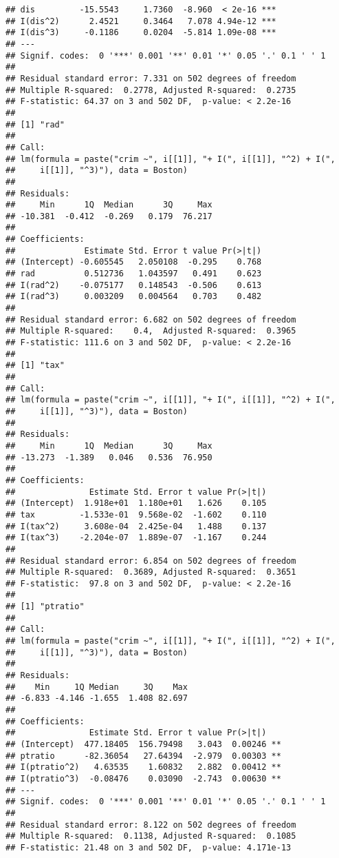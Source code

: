 \documentclass[
]{article}
\begin{document}
\begin{verbatim}
## dis         -15.5543     1.7360  -8.960  < 2e-16 ***
## I(dis^2)      2.4521     0.3464   7.078 4.94e-12 ***
## I(dis^3)     -0.1186     0.0204  -5.814 1.09e-08 ***
## ---
## Signif. codes:  0 '***' 0.001 '**' 0.01 '*' 0.05 '.' 0.1 ' ' 1
## 
## Residual standard error: 7.331 on 502 degrees of freedom
## Multiple R-squared:  0.2778, Adjusted R-squared:  0.2735 
## F-statistic: 64.37 on 3 and 502 DF,  p-value: < 2.2e-16
## 
## [1] "rad"
## 
## Call:
## lm(formula = paste("crim ~", i[[1]], "+ I(", i[[1]], "^2) + I(", 
##     i[[1]], "^3)"), data = Boston)
## 
## Residuals:
##     Min      1Q  Median      3Q     Max 
## -10.381  -0.412  -0.269   0.179  76.217 
## 
## Coefficients:
##              Estimate Std. Error t value Pr(>|t|)
## (Intercept) -0.605545   2.050108  -0.295    0.768
## rad          0.512736   1.043597   0.491    0.623
## I(rad^2)    -0.075177   0.148543  -0.506    0.613
## I(rad^3)     0.003209   0.004564   0.703    0.482
## 
## Residual standard error: 6.682 on 502 degrees of freedom
## Multiple R-squared:    0.4,  Adjusted R-squared:  0.3965 
## F-statistic: 111.6 on 3 and 502 DF,  p-value: < 2.2e-16
## 
## [1] "tax"
## 
## Call:
## lm(formula = paste("crim ~", i[[1]], "+ I(", i[[1]], "^2) + I(", 
##     i[[1]], "^3)"), data = Boston)
## 
## Residuals:
##     Min      1Q  Median      3Q     Max 
## -13.273  -1.389   0.046   0.536  76.950 
## 
## Coefficients:
##               Estimate Std. Error t value Pr(>|t|)
## (Intercept)  1.918e+01  1.180e+01   1.626    0.105
## tax         -1.533e-01  9.568e-02  -1.602    0.110
## I(tax^2)     3.608e-04  2.425e-04   1.488    0.137
## I(tax^3)    -2.204e-07  1.889e-07  -1.167    0.244
## 
## Residual standard error: 6.854 on 502 degrees of freedom
## Multiple R-squared:  0.3689, Adjusted R-squared:  0.3651 
## F-statistic:  97.8 on 3 and 502 DF,  p-value: < 2.2e-16
## 
## [1] "ptratio"
## 
## Call:
## lm(formula = paste("crim ~", i[[1]], "+ I(", i[[1]], "^2) + I(", 
##     i[[1]], "^3)"), data = Boston)
## 
## Residuals:
##    Min     1Q Median     3Q    Max 
## -6.833 -4.146 -1.655  1.408 82.697 
## 
## Coefficients:
##               Estimate Std. Error t value Pr(>|t|)   
## (Intercept)  477.18405  156.79498   3.043  0.00246 **
## ptratio      -82.36054   27.64394  -2.979  0.00303 **
## I(ptratio^2)   4.63535    1.60832   2.882  0.00412 **
## I(ptratio^3)  -0.08476    0.03090  -2.743  0.00630 **
## ---
## Signif. codes:  0 '***' 0.001 '**' 0.01 '*' 0.05 '.' 0.1 ' ' 1
## 
## Residual standard error: 8.122 on 502 degrees of freedom
## Multiple R-squared:  0.1138, Adjusted R-squared:  0.1085 
## F-statistic: 21.48 on 3 and 502 DF,  p-value: 4.171e-13

\end{verbatim}
\end{document}
